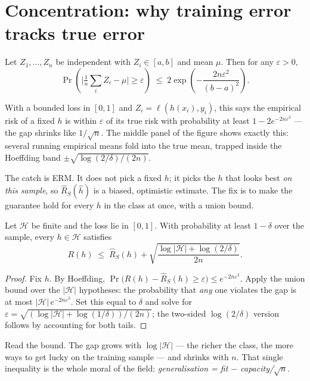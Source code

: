 \documentclass[11pt]{article}
\begin{document}
\section{Concentration: why training error tracks true error}

\begin{theorem}
Let $Z_1,\dots,Z_n$ be independent with $Z_i\in[a,b]$ and mean $\mu$. Then for
any $\varepsilon>0$,
\[
  \Pr\!\left(\Big|\tfrac1n\textstyle\sum_i Z_i - \mu\Big| \ge \varepsilon\right)
  \;\le\; 2\exp\!\left(-\frac{2n\varepsilon^2}{(b-a)^2}\right).
\]
\end{theorem}

With a bounded loss in $[0,1]$ and $Z_i=\ell(h(x_i),y_i)$, this says the
empirical risk of a fixed $h$ is within $\varepsilon$ of its true risk with
probability at least $1-2e^{-2n\varepsilon^2}$ --- the gap shrinks like
$1/\sqrt n$. The middle panel of the figure shows exactly this: several running
empirical means fold into the true mean, trapped inside the Hoeffding band
$\pm\sqrt{\log(2/\delta)/(2n)}$.

The catch is ERM. It does not pick a fixed $h$; it picks the $h$ that looks best
\emph{on this sample}, so $\widehat R_S(\hat h)$ is a biased, optimistic estimate.
The fix is to make the guarantee hold for every $h$ in the class at once, with a
union bound.

\begin{theorem}
Let $\mathcal{H}$ be finite and the loss lie in $[0,1]$. With probability at
least $1-\delta$ over the sample, every $h\in\mathcal{H}$ satisfies
\[
  R(h) \;\le\; \widehat R_S(h) + \sqrt{\frac{\log|\mathcal{H}| + \log(2/\delta)}{2n}}.
\]
\end{theorem}
\begin{proof}
Fix $h$. By Hoeffding, $\Pr\big(R(h)-\widehat R_S(h) \ge \varepsilon\big)\le
e^{-2n\varepsilon^2}$. Apply the union bound over the $|\mathcal{H}|$ hypotheses:
the probability that \emph{any} one violates the gap is at most
$|\mathcal{H}|\,e^{-2n\varepsilon^2}$. Set this equal to $\delta$ and solve for
$\varepsilon=\sqrt{(\log|\mathcal{H}|+\log(1/\delta))/(2n)}$; the two-sided
$\log(2/\delta)$ version follows by accounting for both tails.
\end{proof}

Read the bound. The gap grows with $\log|\mathcal{H}|$ --- the richer the class,
the more ways to get lucky on the training sample --- and shrinks with $n$.
That single inequality is the whole moral of the field: \emph{generalisation =
fit $-$ capacity/$\sqrt n$}.
\end{document}
